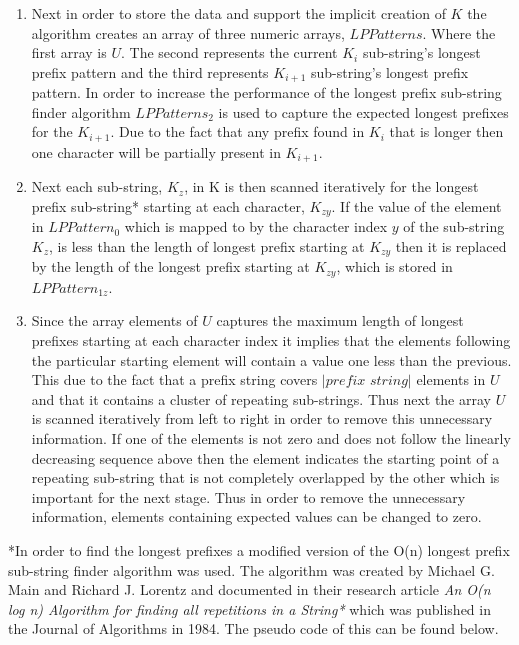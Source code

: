 \documentclass[12pt]{article}
\begin{document}
\begin{flushleft}
\begin{enumerate}
		\item Next in order to store the data and support the implicit creation of $K$ the algorithm creates an array of three numeric arrays, $LPPatterns$. Where the first array is $U$. The second represents the current $K_{i}$ sub-string's longest prefix pattern and the third represents $K_{i + 1}$ sub-string's longest prefix pattern. In order to increase the performance of the longest prefix sub-string finder algorithm $LPPatterns_{2}$ is used to capture the expected longest prefixes for the $K_{i + 1}$. Due to the fact that any prefix found in $K_{i}$ that is longer then one character will be partially present in $K_{i + 1}$.
		
		\item Next each sub-string, $K_{z}$, in K is then scanned iteratively for the longest prefix sub-string* starting at each character, $K_{zy}$. If the value of the element in $LPPattern_{0}$ which is mapped to by the character index $y$ of the sub-string $K_{z}$, is less than the length of longest prefix starting at $K_{zy}$ then it is replaced by the length of the longest prefix starting at $K_{zy}$, which is stored in $LPPattern_{1z}$. \\
						
		\item Since the array elements of $U$ captures the maximum length of longest prefixes starting at each character index it implies that the elements following the particular starting element will contain a value one less than the previous. This due to the fact that a prefix string covers $|\textit{prefix string}|$ elements in $U$ and that it contains a cluster of repeating sub-strings. Thus next the array $U$ is scanned iteratively from left to right in order to remove this unnecessary information. If one of the elements is not zero and does not follow the linearly decreasing sequence above then the element indicates the starting point of a repeating sub-string that is not completely overlapped by the other which is important for the next stage. Thus in order to remove the unnecessary information, elements containing expected values can be changed to zero.
		
		\end{enumerate}
				  
		*In order to find the longest prefixes a modified version of the O(n) longest prefix sub-string finder algorithm was used. The algorithm was created by Michael G. Main and Richard J. Lorentz and documented in their research article \textit{An O(n log n) Algorithm for finding all repetitions in a String*} which was published in the Journal of Algorithms in 1984. The pseudo code of this can be found below.\\
		\newpage

\end{flushleft}
\end{document}
